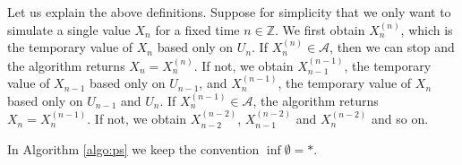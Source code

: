 \documentclass[a4paper]{article}
\newcommand{\Z}{\mathbb{Z}}
\newcommand{\A}{\mathcal{A}}
\newcommand{\mydef}{:=}
\begin{document}
Let us explain the above definitions. Suppose for simplicity that we only want to simulate a single value $X_n$ for a fixed time $n\in \Z$.
We first obtain $X_n^{(n)}$, which is the temporary value of $X_n$ based only on $U_n$.
If $X_{n}^{(n)}\in \A$, then we can stop and the algorithm returns $X_n=X_{n}^{(n)}$. If not, we obtain $X_{n-1}^{(n-1)}$, the temporary value of $X_{n-1}$ based only on $U_{n-1}$, and $X_n^{(n-1)}$, the temporary value of $X_{n}$ based only on $U_{n-1}$ and $U_{n}$. %
If $X_{n}^{(n-1)}\in \A$, the algorithm returns $X_n=X_{n}^{(n-1)}$. If not, we obtain $X_{n-2}^{(n-2)}$, $X_{n-1}^{(n-2)}$ and $X_{n}^{(n-2)}$ and so on. 



In Algorithm \ref{algo:ps} we keep the convention $\inf\emptyset=*$.
\end{document}
